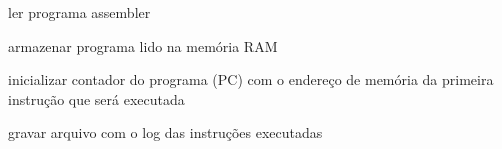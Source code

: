 \begin{algorithm}[ht]
{        \BlankLine

        ler programa assembler

        \BlankLine

        armazenar programa lido na memória RAM

        \BlankLine

        inicializar contador do programa (PC) com o endereço de memória da primeira instrução que será executada

        \BlankLine
        

        \BlankLine

        gravar arquivo com o log das instruções executadas

    } 

\end{algorithm}